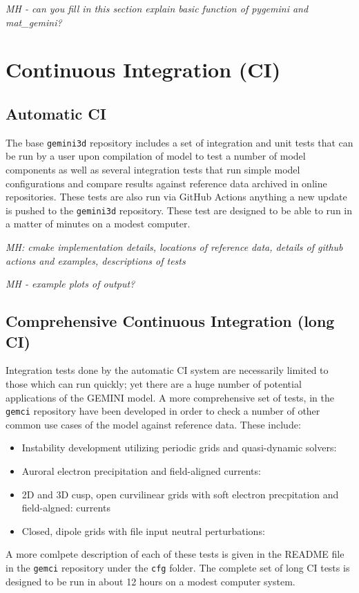 \documentclass[11pt,letterpaper]{article}
\begin{document}
\emph{MH - can you fill in this section explain basic function of pygemini and mat\_gemini?}


\section{Continuous Integration (CI)}

\subsection{Automatic CI}

The base \texttt{gemini3d} repository includes a set of integration and unit tests that can be run by a user upon compilation of model to test a number of model components as well as several integration tests that run simple model configurations and compare results against reference data archived in online repositories.  These tests are also run via GitHub Actions anything a new update is pushed to the \texttt{gemini3d} repository.  These test are designed to be able to run in a matter of minutes on a modest computer.  

\emph{MH:  cmake implementation details, locations of reference data, details of github actions and examples, descriptions of tests}

\emph{MH - example plots of output?}

\subsection{Comprehensive Continuous Integration (long CI)}

Integration tests done by the automatic CI system are necessarily limited to those which can run quickly; yet there are a huge number of potential applications of the GEMINI model.  A more comprehensive set of tests, in the \texttt{gemci} repository have been developed in order to check a number of other common use cases of the model against reference data.  These include:
\begin{itemize}
  \item Instability development utilizing periodic grids and quasi-dynamic solvers:  
  \item Auroral electron precipitation and field-aligned currents:  
  \item 2D and 3D cusp, open curvilinear grids with soft electron precpitation and field-algned:   currents
  \item Closed, dipole grids with file input neutral perturbations:  
\end{itemize}
A more comlpete description of each of these tests is given in the README file in the \texttt{gemci} repository under the \texttt{cfg} folder.  The complete set of long CI tests is designed to be run in about 12 hours on a modest computer system.  
\end{document}
